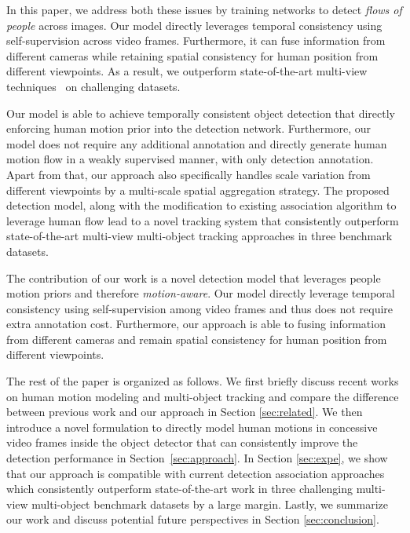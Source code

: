 \documentclass[10pt,twocolumn,letterpaper]{article}
\begin{document}
In this paper, we address both these issues by training networks to detect {\it flows of people} across images.  Our model directly leverages temporal consistency using self-supervision across video frames. Furthermore, it can fuse information from different cameras while retaining spatial consistency for human position from different viewpoints. As a result, we outperform state-of-the-art multi-view techniques~\cite{hou2021multiview,hou2020multiview,Chavdarova18a} on challenging datasets.





\iffalse

Our model is able to achieve temporally consistent object detection that directly enforcing human motion prior into the detection network. Furthermore, our model does not require any additional annotation and directly generate human motion flow in a weakly supervised manner, with only detection annotation. Apart from that, our approach also specifically handles scale variation from different viewpoints by a multi-scale spatial aggregation strategy. The proposed detection model, along with the modification to existing association algorithm to leverage human flow lead to a novel tracking system that consistently outperform state-of-the-art multi-view multi-object tracking approaches in three benchmark datasets. 

The contribution of our work is a novel detection model that leverages people motion priors and therefore {\it motion-aware}. Our model directly leverage temporal consistency using self-supervision among video frames and thus does not require extra annotation cost. Furthermore, our approach is able to fusing information from different cameras and remain spatial consistency for human position from different viewpoints. 

The rest of the paper is organized as follows. We first briefly discuss recent works on human motion modeling and multi-object tracking and compare the difference between previous work and our approach in Section \ref{sec:related}.  We then introduce a novel formulation to directly model human motions in concessive video frames inside the object detector that can consistently improve the detection performance in Section~\ref{sec:approach}.
In Section \ref{sec:expe}, we  show that our approach is compatible with current detection association approaches which consistently outperform state-of-the-art work in three challenging multi-view multi-object benchmark datasets by a large margin. Lastly, we summarize our work and discuss potential future perspectives in Section \ref{sec:conclusion}.
\end{document}
